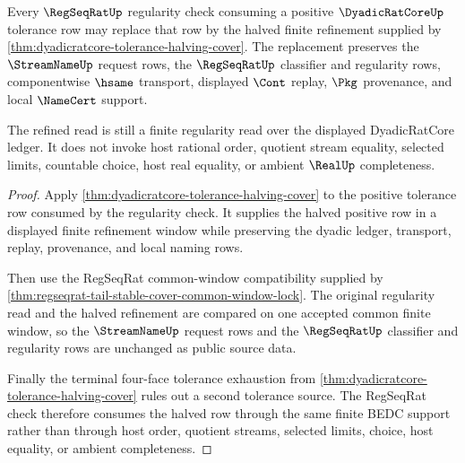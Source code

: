 \begin{theorem}
\label{thm:dyadicratcore-halving-cover-regseqrat-handoff}
Every $\RegSeqRatUp$ regularity check consuming a positive $\DyadicRatCoreUp$
tolerance row may replace that row by the halved finite refinement supplied by
\autoref{thm:dyadicratcore-tolerance-halving-cover}. The replacement preserves
the $\StreamNameUp$ request rows, the $\RegSeqRatUp$ classifier and regularity
rows, componentwise $\hsame$ transport, displayed $\Cont$ replay, $\Pkg$
provenance, and local $\NameCert$ support.

The refined read is still a finite regularity read over the displayed
DyadicRatCore ledger. It does not invoke host rational order, quotient stream
equality, selected limits, countable choice, host real equality, or ambient
$\RealUp$ completeness.
\end{theorem}
\begin{proof}
Apply \autoref{thm:dyadicratcore-tolerance-halving-cover} to the positive
tolerance row consumed by the regularity check. It supplies the halved positive
row in a displayed finite refinement window while preserving the dyadic ledger,
transport, replay, provenance, and local naming rows.

Then use the RegSeqRat common-window compatibility supplied by
\autoref{thm:regseqrat-tail-stable-cover-common-window-lock}. The original
regularity read and the halved refinement are compared on one accepted common
finite window, so the $\StreamNameUp$ request rows and the $\RegSeqRatUp$
classifier and regularity rows are unchanged as public source data.

Finally the terminal four-face tolerance exhaustion from
\autoref{thm:dyadicratcore-tolerance-halving-cover} rules out a second
tolerance source. The RegSeqRat check therefore consumes the halved row through
the same finite BEDC support rather than through host order, quotient streams,
selected limits, choice, host equality, or ambient completeness.
\end{proof}

